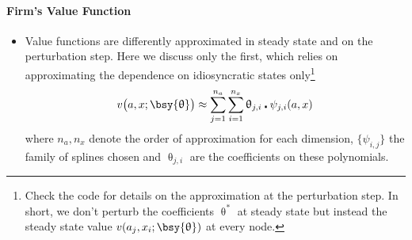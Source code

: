 \documentclass[a4paper,10pt]{article}  %
\begin{document}
\paragraph{Firm's Value Function} %
\label{par:firm_s_value_function}
\begin{itemize}[label=\raisebox{0.50ex}{\tiny$\bullet$}]
   
   \item Value functions are differently approximated in steady state and on the perturbation step. Here we discuss only 
   the first, which relies on approximating the dependence on idiosyncratic states only\footnote{Check the code for
   details on the approximation at the perturbation step. In short, we don't perturb the coefficients $ \uptheta^* $ at
   steady state but instead the steady state value $ v(a_j,x_i; \bsy{\uptheta} ) $ at every node. }
   \begin{equation}
      \label{eq:approx_value_function}
      v\big( a, x ; \bsy{\uptheta} \big) \approx \sum_{j=1}^{n_a} \sum_{i=1}^{n_x} \uptheta_{j,i} \centerdot \psi_{j,i} (a,x)
   \end{equation}
   where $ n_a, n_x $ denote the order of approximation for each dimension, $ \big\{ \psi_{i,j} \big\} $ the family of
   splines chosen and $ \uptheta_{j,i} $ are the coefficients on these polynomials.


\end{itemize}
\end{document}
